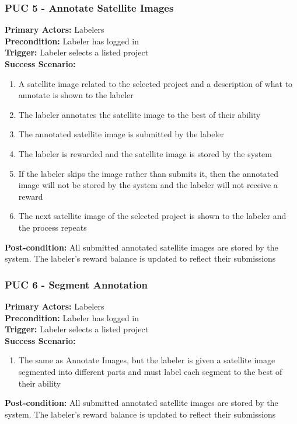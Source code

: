 \documentclass[12pt]{article}
\begin{document}
\subsubsection{PUC 5 - Annotate Satellite Images}
\textbf{Primary Actors:} Labelers\\ 
\textbf{Precondition:} Labeler has logged in\\
\textbf{Trigger:} Labeler selects a listed project\\
\textbf{Success Scenario:}
\begin{enumerate}
    \item A satellite image related to the selected project and a description of what to annotate is shown to the labeler
    \item The labeler annotates the satellite image to the best of their ability
    \item The annotated satellite image is submitted by the labeler
    \item The labeler is rewarded and the satellite image is stored by the system
    \item If the labeler skips the image rather than submits it, then the annotated image will not be stored by the system and the labeler will not receive a reward
    \item The next satellite image of the selected project is shown to the labeler and the process repeats
\end{enumerate}
\textbf{Post-condition:} All submitted annotated satellite images are stored by the system. The labeler's reward balance is updated to reflect their submissions

\subsubsection{PUC 6 - Segment Annotation}
\textbf{Primary Actors:} Labelers\\ 
\textbf{Precondition:} Labeler has logged in\\
\textbf{Trigger:} Labeler selects a listed project\\
\textbf{Success Scenario:}
\begin{enumerate}
    \item The same as Annotate Images, but the labeler is given a satellite image segmented into different parts and must label each segment to the best of their ability 
\end{enumerate}
\textbf{Post-condition:} All submitted annotated satellite images are stored by the system. The labeler's reward balance is updated to reflect their submissions
\end{document}
